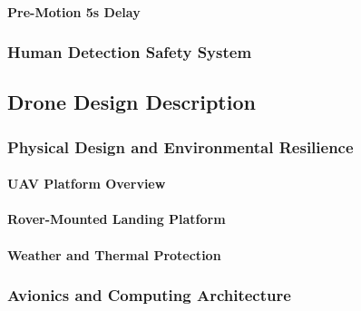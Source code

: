 \paragraph{Pre-Motion 5s Delay}
\label{par:pre_motion_5s_delay}


\subsubsection{Human Detection Safety System}
\label{subsubsec:human_detection_safety_system}


\subsection{Drone Design Description}
\label{subsec:drone_design_description}

\subsubsection{Physical Design and Environmental Resilience}
\label{subsubsec:physical_design_environmental_resilience}

\paragraph{UAV Platform Overview}
\label{par:uav_platform_overview}


\paragraph{Rover-Mounted Landing Platform}
\label{par:rover_mounted_landing_platform}


\paragraph{Weather and Thermal Protection}
\label{par:weather_thermal_protection}


\subsubsection{Avionics and Computing Architecture}
\label{subsubsec:avionics_computing_architecture}

